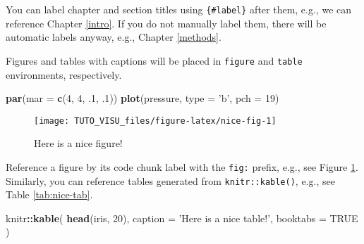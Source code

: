\documentclass[]{book}
\newenvironment{Shaded}{\begin{snugshade}}{\end{snugshade}}
\newcommand{\DataTypeTok}[1]{\textcolor[rgb]{0.13,0.29,0.53}{#1}}
\newcommand{\DecValTok}[1]{\textcolor[rgb]{0.00,0.00,0.81}{#1}}
\newcommand{\FloatTok}[1]{\textcolor[rgb]{0.00,0.00,0.81}{#1}}
\newcommand{\KeywordTok}[1]{\textcolor[rgb]{0.13,0.29,0.53}{\textbf{#1}}}
\newcommand{\NormalTok}[1]{#1}
\newcommand{\OperatorTok}[1]{\textcolor[rgb]{0.81,0.36,0.00}{\textbf{#1}}}
\newcommand{\OtherTok}[1]{\textcolor[rgb]{0.56,0.35,0.01}{#1}}
\newcommand{\StringTok}[1]{\textcolor[rgb]{0.31,0.60,0.02}{#1}}
\theoremstyle{definition}
\theoremstyle{definition}
\theoremstyle{definition}
\theoremstyle{remark}
\begin{document}
You can label chapter and section titles using \texttt{\{\#label\}} after them, e.g., we can reference Chapter \ref{intro}. If you do not manually label them, there will be automatic labels anyway, e.g., Chapter \ref{methods}.

Figures and tables with captions will be placed in \texttt{figure} and \texttt{table} environments, respectively.

\begin{Shaded}
\begin{Highlighting}[]
\KeywordTok{par}\NormalTok{(}\DataTypeTok{mar =} \KeywordTok{c}\NormalTok{(}\DecValTok{4}\NormalTok{, }\DecValTok{4}\NormalTok{, }\FloatTok{.1}\NormalTok{, }\FloatTok{.1}\NormalTok{))}
\KeywordTok{plot}\NormalTok{(pressure, }\DataTypeTok{type =} \StringTok{'b'}\NormalTok{, }\DataTypeTok{pch =} \DecValTok{19}\NormalTok{)}
\end{Highlighting}
\end{Shaded}

\begin{figure}

{\centering \texttt{[image: TUTO\_VISU\_files/figure-latex/nice-fig-1]} 

}

\caption{Here is a nice figure!}\label{fig:nice-fig}
\end{figure}

Reference a figure by its code chunk label with the \texttt{fig:} prefix, e.g., see Figure \ref{fig:nice-fig}. Similarly, you can reference tables generated from \texttt{knitr::kable()}, e.g., see Table \ref{tab:nice-tab}.

\begin{Shaded}
\begin{Highlighting}[]
\NormalTok{knitr}\OperatorTok{::}\KeywordTok{kable}\NormalTok{(}
  \KeywordTok{head}\NormalTok{(iris, }\DecValTok{20}\NormalTok{), }\DataTypeTok{caption =} \StringTok{'Here is a nice table!'}\NormalTok{,}
  \DataTypeTok{booktabs =} \OtherTok{TRUE}
\NormalTok{)}
\end{Highlighting}
\end{Shaded}
\end{document}
